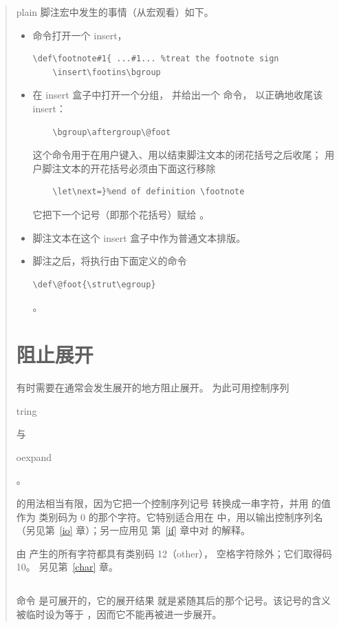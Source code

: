 \documentclass[a4paper]{rapport3}
\makeatletter
\newenvironment{disp}{\begin{quotation}}{\end{quotation}}
\def\cstoidx#1\par{\index{#1@\cs{#1}}}
\def\csidx#1{\cstoidx #1\par\cs{#1}}
\makeatother
\begin{document}
\begin{disp}
plain 脚注宏中发生的事情（从宏观看）如下。
\begin{itemize}\item {} 命令打开一个 insert， \begin{verbatim}
\def\footnote#1{ ...#1... %treat the footnote sign
    \insert\footins\bgroup
\end{verbatim}
\item 在 insert 盒子中打开一个分组，
并给出一个  命令，
以正确地收尾该 insert：
\begin{verbatim}
    \bgroup\aftergroup\@foot
\end{verbatim}
这个命令用于在用户键入、用以结束脚注文本的闭花括号之后收尾；
用户脚注文本的开花括号必须由下面这行移除 
\begin{verbatim}
    \let\next=}%end of definition \footnote
\end{verbatim}
它把下一个记号（即那个花括号）赋给 。
\item 脚注文本在这个 insert 盒子中作为普通文本排版。
\item 脚注之后，将执行由下面定义的命令  \begin{verbatim}
\def\@foot{\strut\egroup}
\end{verbatim}
。\end{itemize}


\section{阻止展开}

有时需要在通常会发生展开的地方阻止展开。
为此可用控制序列 \csidx{string} 与 \csidx{noexpand}。

 的用法相当有限，因为它把一个控制序列记号
转换成一串字符，并用  的值作为
类别码为 0 的那个字符。它特别适合用在
 中，用以输出控制序列名
（另见第~\ref{io} 章）；另一应用见
第~\ref{if} 章中对  的解释。

由  产生的所有字符都具有类别码 12（other），
空格字符除外；它们取得码 10。
另见第~\ref{char} 章。

\subsection{\protect{}}

命令  是可展开的，它的展开结果
就是紧随其后的那个记号。该记号的含义被临时设为等于
，因而它不能再被进一步展开。


\end{disp}
\end{document}
